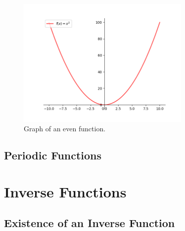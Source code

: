 \documentclass[a4paper]{article}
\theoremstyle{definition}
\begin{document}
\begin{figure}[h]
    \begin{small}
        \begin{center}
            \includegraphics[width=0.75\textwidth]{../out/graphs.png}
        \end{center}
        \caption{Graph of an even function.}
        \label{fig: Even Function}
    \end{small}
\end{figure}

\subsection{Periodic Functions}
\section{Inverse Functions}
\subsection{Existence of an Inverse Function}
\end{document}
